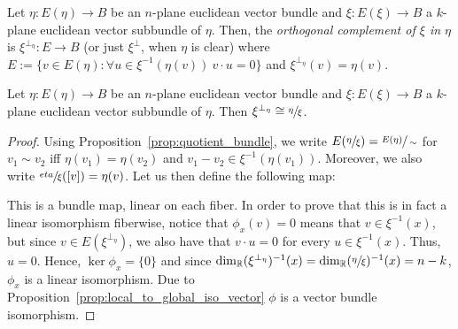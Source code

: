 \begin{definition} Let $\eta:E(\eta)\to B$ be an $n$-plane euclidean vector bundle and $\xi:E(\xi)\to B$ a $k$-plane euclidean vector subbundle of $\eta$. Then, the \emph{orthogonal complement of $\xi$ in $\eta$} is $\xi^{\perp_{\eta}}:E\to B$ (or just $\xi^{\perp}$, when $\eta$ is clear) where $E:=\{v\in E(\eta):\forall u\in\xi^{-1}(\eta(v))\ v\cdot u=0\}$ and $\xi^{\perp_{\eta}}(v)=\eta(v)$.
\end{definition}

\begin{lemma} Let $\eta:E(\eta)\to B$ be an $n$-plane euclidean vector bundle and $\xi:E(\xi)\to B$ a $k$-plane euclidean vector subbundle of $\eta$. Then $\xi^{\perp_{\eta}}\cong\sfrac{\eta}{\xi}$.
\end{lemma}
\begin{proof} Using Proposition~\ref{prop:quotient_bundle}, we write $E(\sfrac{\eta}{\xi})=\sfrac{E(\eta)}{\sim}$ for $v_1\sim v_2$ iff $\eta(v_1)=\eta(v_2)$ and $v_1-v_2\in\xi^{-1}(\eta(v_1))$. Moreover, we also write $\sfrac{eta}{\xi}([v])=\eta(v)$. Let us then define the following map:
\begin{center}
\end{center}
This is a bundle map, linear on each fiber. In order to prove that this is in fact a linear isomorphism fiberwise, notice that $\phi_x(v)=0$ means that $v\in\xi^{-1}(x)$, but since $v\in E(\xi^{\perp_{\eta}})$, we also have that $v\cdot u=0$ for every $u\in\xi^{-1}(x)$. Thus, $u=0$. Hence, $\ker\phi_x=\{0\}$ and since $\dim_{\mathbb{R}}(\xi^{\perp_{\eta}})^{-1}(x)=\dim_{\mathbb{R}}(\sfrac{\eta}{\xi})^{-1}(x)=n-k$, $\phi_x$ is a linear isomorphism. Due to Proposition~\ref{prop:local_to_global_iso_vector} $\phi$ is a vector bundle isomorphism.
\end{proof}

